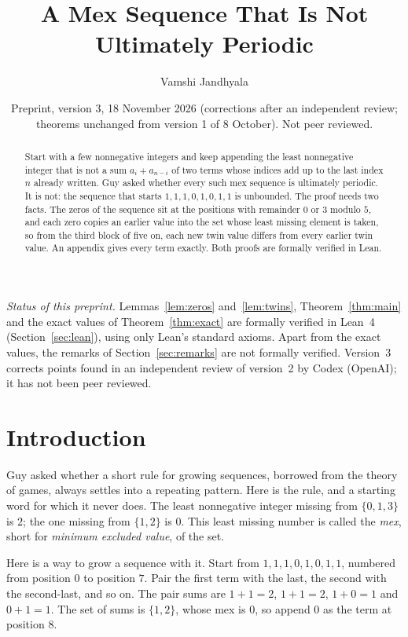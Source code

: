 \documentclass[11pt]{amsart}
\title{A Mex Sequence That Is Not Ultimately Periodic}
\author{Vamshi Jandhyala}
\date{Preprint, version 3, 18 November 2026 (corrections after an independent review; theorems unchanged from version 1 of 8 October). Not peer reviewed.}
\theoremstyle{remark}
\begin{document}
\begin{abstract}
Start with a few nonnegative integers and keep appending the least nonnegative integer that is not a sum $a_i+a_{n-i}$ of two terms whose indices add up to the last index $n$ already written. Guy asked whether every such mex sequence is ultimately periodic. It is not: the sequence that starts $1,1,1,0,1,0,1,1$ is unbounded. The proof needs two facts. The zeros of the sequence sit at the positions with remainder $0$ or $3$ modulo $5$, and each zero copies an earlier value into the set whose least missing element is taken, so from the third block of five on, each new twin value differs from every earlier twin value. An appendix gives every term exactly. Both proofs are formally verified in Lean.
\end{abstract}

\maketitle

\noindent\emph{Status of this preprint.} Lemmas~\ref{lem:zeros} and~\ref{lem:twins}, Theorem~\ref{thm:main} and the exact values of Theorem~\ref{thm:exact} are formally verified in Lean~4 (Section~\ref{sec:lean}), using only Lean's standard axioms. Apart from the exact values, the remarks of Section~\ref{sec:remarks} are not formally verified. Version~3 corrects points found in an independent review of version~2 by Codex (OpenAI); it has not been peer reviewed.

\section{Introduction}

Guy asked whether a short rule for growing sequences, borrowed from the theory of games, always settles into a repeating pattern. Here is the rule, and a starting word for which it never does.
The least nonnegative integer missing from $\{0,1,3\}$ is $2$; the one missing from $\{1,2\}$ is $0$. This least missing number is called the \emph{mex}, short for \emph{minimum excluded value}, of the set.

Here is a way to grow a sequence with it. Start from $1,1,1,0,1,0,1,1$, numbered from position $0$ to position $7$. Pair the first term with the last, the second with the second-last, and so on. The pair sums are $1+1=2$, $1+1=2$, $1+0=1$ and $0+1=1$. The set of sums is $\{1,2\}$, whose mex is $0$, so append $0$ as the term at position $8$.
\end{document}
